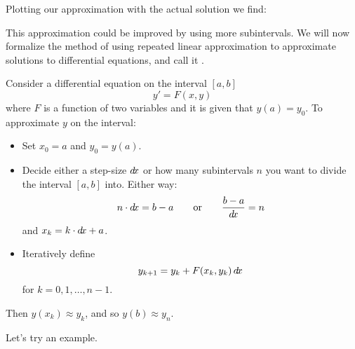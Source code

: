 \documentclass{ximera}
\begin{document}
Plotting our approximation with the actual solution we find:
\begin{image}
\end{image}
This approximation could be improved by using more subintervals.  We
will now formalize the method of using repeated linear approximation
to approximate solutions to differential equations, and call it
.

\begin{definition}
  Consider a differential equation on the interval $[a,b]$
  \[
  y' = F(x,y)
  \]
  where $F$ is a function of two variables and it is given that $y(a)
  = y_0$. To approximate $y$ on the interval:
  \begin{itemize}
  \item Set $x_0=a$ and $y_0 = y(a)$.
  \item Decide either a step-size $\mathop{}\!d\! x$ or how many subintervals $n$ you
    want to divide the interval $[a,b]$ into. Either way:
    \[
    n\cdot \mathop{}\!d\! x = b-a \qquad\text{or}\qquad \frac{b-a}{\mathop{}\!d\! x} = n
    \]
    and $x_k = k\cdot \mathop{}\!d\! x + a$.
  \item Iteratively define
    \[
    y_{k+1} = y_k + F(x_k,y_k)\mathop{}\!d\! x
    \]
    for $k=0,1,\dots,n-1$.
  \end{itemize}
  Then $y(x_k) \approx y_k$, and so $y(b) \approx y_{n}$.
\end{definition}

Let's try an example.
\end{document}
